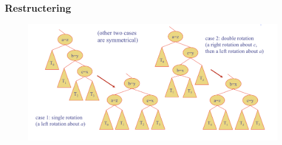 \documentclass[a4paper,10pt]{report}
\begin{document}
\subsubsection{Restructering}
\begin{figure}[H]
	\begin{center}
  		\includegraphics[width=\textwidth]{img/avltreerestructering.png}
	\end{center}
\end{figure}
\end{document}
